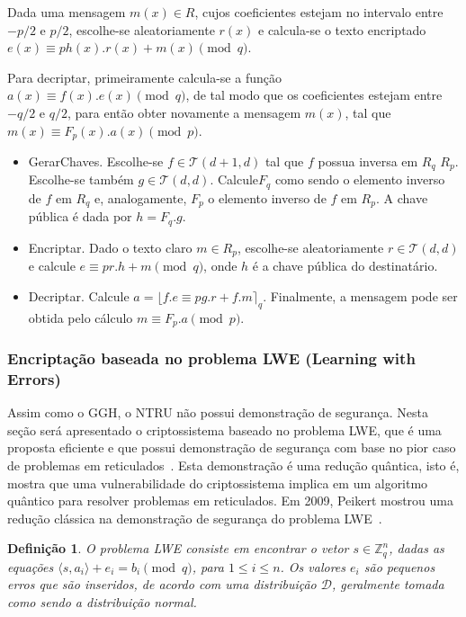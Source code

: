 \documentclass{SBCbookchapter}
\newtheorem{definition}{Definição}{\bfseries}{\itshape}
\begin{document}
\begin{otherlanguage}{brazilian}
Dada uma mensagem $m(x) \in R$, cujos coeficientes estejam no intervalo entre $-p/2$ e $p/2$, escolhe-se aleatoriamente $r(x)$ e calcula-se o texto encriptado $e(x) \equiv p h(x).r(x) + m(x) \pmod q$. 

Para decriptar, primeiramente calcula-se a função $a(x) \equiv f(x).e(x) \pmod q$, de tal modo que os coeficientes estejam entre $-q/2$ e $q/2$, para então obter novamente a mensagem $m(x)$, tal que $m(x) \equiv F_p(x).a(x) \pmod p$.

\begin{itemize}
\item \textsf{GerarChaves.}  Escolhe-se $f \in \mathcal{T}(d+1, d)$ tal que $f$ possua inversa em $R_q$  $R_p$. Escolhe-se também $g \in \mathcal{T}(d,d)$. Calcule$F_q$ como sendo o elemento inverso de $f$ em $R_q$ e, analogamente, $F_p$ o elemento inverso de $f$ em $R_p$. A chave pública é 
dada por $h = F_q.g$.  

\item \textsf{Encriptar.} Dado o texto claro $m \in R_p$, escolhe-se aleatoriamente $r \in \mathcal{T}(d,d)$ e calcule $e \equiv pr.h + m \pmod{q}$, onde $h$ é a chave pública do destinatário. 

\item \textsf{Decriptar.} Calcule $a = \lfloor f.e \equiv pg.r + f.m \rceil_q$. Finalmente, a mensagem pode ser obtida pelo cálculo $m \equiv F_p.a \pmod{p}$. 
\end{itemize}

\subsubsection{Encriptação baseada no problema LWE (Learning with Errors)}
\label{LWE}

Assim como o GGH, o NTRU não possui demonstração de segurança. Nesta seção será apresentado o criptossistema baseado no problema LWE, que é uma proposta eficiente e que possui demonstração de segurança com base no pior caso de problemas em reticulados~\cite{surveyRegev10}. Esta demonstração é uma redução quântica, isto é, mostra que uma vulnerabilidade do criptossistema implica em um algoritmo quântico para resolver problemas em reticulados. Em 2009, Peikert mostrou uma redução clássica na demonstração de segurança do problema LWE~\cite{peikert}.

\begin{definition}
O \textit{problema LWE} consiste em encontrar o vetor $s \in \mathbb{Z}_q^n$, dadas as equações $\langle s, a_i \rangle + e_i = b_i \pmod q$, para $1 \leq i \leq n$. Os valores $e_i$ são pequenos erros que são inseridos, de acordo com uma distribuição $\mathcal{D}$, geralmente tomada como sendo a distribuição normal. 
\end{definition}


\end{otherlanguage}
\end{document}
